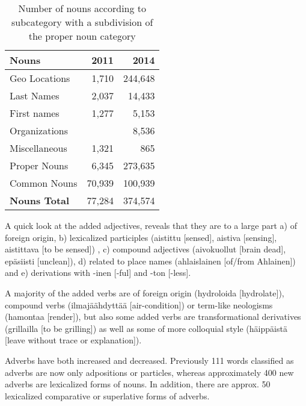 \documentclass[11pt]{article}
\begin{document}
\begin{table}[h]
    \begin{center}
        \begin{tabular}{|l|rr|}
            \hline
            \bf Nouns             & \bf 2011 & \bf 2014 \\
            \hline
            \sc Geo Locations    & 1,710     & 244,648 \\
            \sc Last Names        & 2,037     & 14,433 \\
            \sc First names        & 1,277     & 5,153 \\
            \sc Organizations   &               & 8,536 \\
            \sc Miscellaneous   & 1,321     & 865 \\
            \hline
            \sc Proper Nouns    & 6,345      & 273,635 \\
            \sc Common Nouns & 70,939    & 100,939 \\
            \hline
            \bf Nouns Total      & 77,284    & 374,574 \\
            \hline
        \end{tabular}
    \end{center}
    \caption{Number of nouns according to subcategory with a subdivision of the proper noun category}
\end{table}

A quick look at the added adjectives, reveals that they are to a large part a)
of foreign origin, b) lexicalized participles (aistittu [sensed], aistiva
[sensing], aistittava [to be sensed]) , c) compound adjectives (aivokuollut
[brain dead], epäsiisti [unclean]), d) related to place names (ahlaislainen
[of/from Ahlainen]) and e) derivations with -inen [-ful] and -ton [-less]. 

A majority of the added verbs are of foreign origin (hydroloida [hydrolate]), compound verbs (ilmajäähdyttää [air-condition]) or term-like neologisms (hamontaa [render]), but also some added verbs are transformational derivatives (grillailla [to be grilling]) as well as some of more colloquial style (häippäistä [leave without trace or explanation]).

Adverbs have both increased and decreased. Previously 111 words classified as
adverbs are now only adpositions or particles, whereas approximately 400 new
adverbs are lexicalized forms of nouns.  In addition, there are approx. 50
lexicalized comparative or superlative forms of adverbs.
\end{document}
